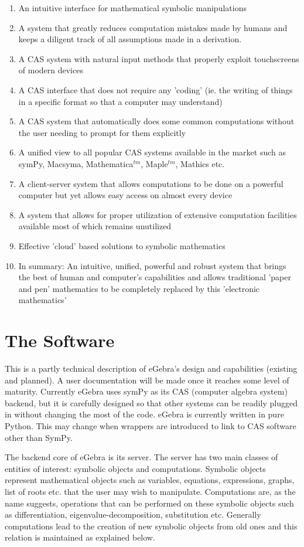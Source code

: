 \documentclass{article}
\begin{document}
\begin{enumerate}
	\item An intuitive interface for mathematical symbolic manipulations
	\item A system that greatly reduces computation mistakes made by humans and keeps a diligent track of all assumptions made in a derivation.
	\item A CAS system with natural input methods that properly exploit touchscreens of modern devices
	\item A CAS interface that does not require any 'coding' (ie. the writing of things in a specific format so that a computer may understand)
	\item A CAS system that automatically does some common computations without the user needing to prompt for them explicitly
	\item A unified view to all popular CAS systems available in the market such as symPy, Macsyma, Mathematica$^{tm}$, Maple$^{tm}$, Mathics etc.
	\item A client-server system that allows computations to be done on a powerful computer but yet allows easy access on almost every device
	\item A system that allows for proper utilization of extensive computation facilities available most of which remains unutilized
	\item Effective 'cloud' based solutions to symbolic mathematics
	\item In summary: An intuitive, unified, powerful and robust system that brings the best of human and computer's capabilities and allows traditional 'paper and pen' mathematics to be completely replaced by this 'electronic mathematics'
\end{enumerate}

\section{The Software}
This is a partly technical description of eGebra's design and capabilities (existing and planned). A user documentation will be made once it reaches some level of maturity. Currently eGebra uses symPy as its CAS (computer algebra system) backend, but it is carefully designed so that other systems can be readily plugged in without changing the most of the code. eGebra is currently written in pure Python. This may change when wrappers are introduced to link to CAS software other than SymPy.

The backend core of eGebra is its server. The server has two main classes of entities of interest: symbolic objects and computations. Symbolic objects represent  mathematical objects such as variables, equations, expressions, graphs, list of roots etc. that the user may wish to manipulate. Computations are, as the name suggests, operations that can be performed on these symbolic objects such as differentiation, eigenvalue-decomposition, substitution etc. Generally computations lead to the creation of new symbolic objects from old ones and this relation is maintained as explained below.
\end{document}
